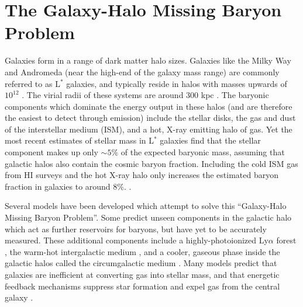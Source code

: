 

\section{The Galaxy-Halo Missing Baryon Problem}
\label{sec:Missing.Galaxies}


Galaxies form in a range of dark matter halo sizes. Galaxies like the
Milky Way and Andromeda (near the high-end of the galaxy mass range)
are commonly referred to as L$^*$ galaxies, and typically reside in
halos with masses upwards of $10^{12}$ \Msun{}
\citep{Moster2010}. The virial radii of these systems are around 300
kpc \citep{Werk2014}. The baryonic components which dominate the energy output in these
halos (and are therefore the easiest to detect through emission)
include the stellar disks, the gas and dust of the interstellar medium
(ISM), and a hot, X-ray emitting halo of gas. Yet the most recent
estimates of stellar mass in L$^*$ galaxies \citep{Behroozi2010} find
that the stellar component makes up only $\sim5\%$ of the expected
baryonic mass, assuming that galactic halos also contain the cosmic
baryon fraction. Including the cold ISM gas from HI surveys and the
hot X-ray halo \citep[][respectively]{Martin2010, Gupta2012} only
increases the estimated baryon fraction in galaxies to around
$8\%$. .

Several models have been developed which attempt to solve this
``Galaxy-Halo Missing Baryon Problem''. Some predict unseen components
in the galactic halo which act as further reservoirs for baryons, but
have yet to be accurately measured.  These additional components
include a highly-photoionized Ly$\alpha$ forest \citep{Sargent1980,
  Cen1994}, the warm-hot intergalactic medium \citep[WHIM][]{Cen1999,
  Dave1999}, and a cooler, gaseous phase inside the galactic halos
called the circumgalactic medium \citep[CGM][]{Bahcall1969,
  Bergeron1985, Lanzetta1995}. Many models predict that galaxies are inefficient at
converting gas into stellar mass, and that energetic feedback
mechanisms suppress star formation and expel gas from the central
galaxy \citep{Somerville1999, Oppenheimer2010}. 


